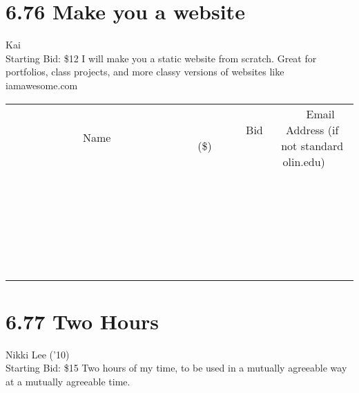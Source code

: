 \documentclass[11pt]{article}
\begin{document}
\section*{6.76 Make you a website}
Kai
\\
Starting Bid: \$12
\newline
I will make you a static website from scratch. Great for portfolios, class projects, and more classy versions of websites like iamawesome.com
\\[6ex]
\begin{tabular}{c c c}
~~~~~~~~~~~~~Name~~~~~~~~~~~~~ & ~~~~~~~~~Bid (\$)~~~~~~~~~  & ~~~Email Address (if not standard olin.edu)~~~\\
 & & \\
\hline
 & & \\
\hline
 & & \\
\hline
 & & \\
\hline
 & & \\
\hline
 & & \\
\hline
 & & \\
\hline
 & & \\
\hline
 & & \\
\hline
 & & \\
\hline
 & & \\
\hline
 & & \\
\hline
 & & \\
\hline
 & & \\
\hline
 & & \\
\hline
 & & \\
\hline
 & & \\
\hline
 & & \\
\hline
 & & \\
\hline
 & & \\
\hline
 & & \\
\hline
 & & \\
\hline
 & & \\
\hline
 & & \\
\hline
 & & \\
\hline
 & & \\
\hline
\end{tabular}
\newpage
\section*{6.77 Two Hours}
Nikki Lee ('10)
\\
Starting Bid: \$15
\newline
Two hours of my time, to be used in a mutually agreeable way at a mutually agreeable time.
\end{document}
